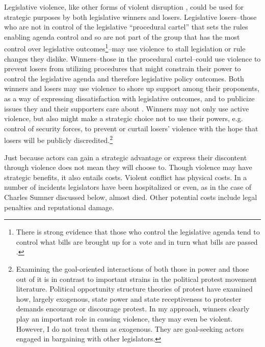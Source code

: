 \documentclass[a4paper]{article}\usepackage[]{graphicx}\usepackage[]{color}
\begin{document}
Legislative violence, like other forms of violent disruption \citep[]{Beaulieu2008,BeaulieuForthcoming,wilkinson2006}, could be used for strategic purposes by both legislative winners and losers. Legislative losers--those who are not in control of the legislative ``procedural cartel''  that sets the rules enabling agenda control \citep{cox2005} and so are not part of the group that has the most control over legislative outcomes\footnote{There is strong evidence that those who control the legislative agenda tend to control what bills are brought up for a vote and in turn what bills are passed \citep[93]{tsebelis2002}.}--may use violence to stall legislation or rule changes they dislike. Winners--those in the procedural cartel--could use violence to prevent losers from utilizing procedures that might constrain their power to control the legislative agenda and therefore legislative policy outcomes. Both winners and losers may use violence to shore up support among their proponents, as a way of expressing dissatisfaction with legislative outcomes, and to publicize issues they and their supporters care about \citep{Spary2013}. Winners may not only use active violence, but also might make a strategic choice not to use their powers, e.g. control of security forces, to prevent or curtail losers' violence with the hope that losers will be publicly discredited.\footnote{Examining the goal-oriented interactions of both those in power and those out of it is in contrast to important strains in the political protest movement literature. Political opportunity structure theories of protest have examined how, largely exogenous, state power \citep{skocpol1979} and state receptiveness to protester demands \citep{mcadam1982,tarrow1989} encourage or discourage protest. In my approach, winners clearly play an important role in causing violence, they may even be violent. However, I do not treat them as exogenous. They are goal-seeking actors engaged in bargaining with other legislators.}

Just because actors can gain a strategic advantage or express their discontent through violence does not mean they will choose to. Though violence may have strategic benefits, it also entails costs. Violent conflict has physical costs. In a number of incidents legislators have been hospitalized or even, as in the case of Charles Sumner discussed below, almost died. Other potential costs include legal penalties and reputational damage.
\end{document}
